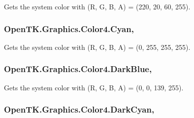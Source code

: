 Gets the system color with (R, G, B, A) = (220, 20, 60, 255). 

\hypertarget{struct_open_t_k_1_1_graphics_1_1_color4_a003302558baa2446439a9379d58d44ad}{
\subsubsection[{Cyan}]{ Open\-T\-K.\-Graphics.\-Color4.\-Cyan\hspace{0.3cm}{\ttfamily [static]}, {\ttfamily [get]}}}\label{struct_open_t_k_1_1_graphics_1_1_color4_a003302558baa2446439a9379d58d44ad}


Gets the system color with (R, G, B, A) = (0, 255, 255, 255). 

\hypertarget{struct_open_t_k_1_1_graphics_1_1_color4_a86f850249f7ef3df8168152f862bb461}{
\subsubsection[{Dark\-Blue}]{ Open\-T\-K.\-Graphics.\-Color4.\-Dark\-Blue\hspace{0.3cm}{\ttfamily [static]}, {\ttfamily [get]}}}\label{struct_open_t_k_1_1_graphics_1_1_color4_a86f850249f7ef3df8168152f862bb461}


Gets the system color with (R, G, B, A) = (0, 0, 139, 255). 

\hypertarget{struct_open_t_k_1_1_graphics_1_1_color4_a1f5edb879622eb928c1fa715887e4498}{
\subsubsection[{Dark\-Cyan}]{ Open\-T\-K.\-Graphics.\-Color4.\-Dark\-Cyan\hspace{0.3cm}{\ttfamily [static]}, {\ttfamily [get]}}}\label{struct_open_t_k_1_1_graphics_1_1_color4_a1f5edb879622eb928c1fa715887e4498}


